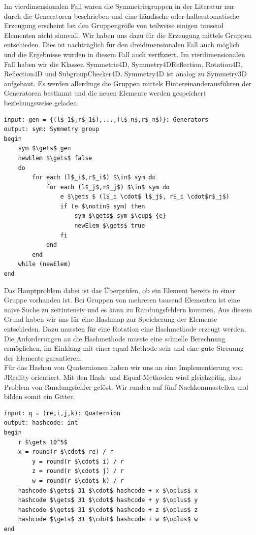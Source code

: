 Im vierdimensionalen Fall waren die Symmetriegruppen in der Literatur nur durch die Generatoren beschrieben und eine händische oder halbautomatische Erzeugung erscheint bei den Gruppengröße von teilweise einigen tausend Elementen nicht sinnvoll. Wir haben uns dazu für die Erzeugung mittels Gruppen entschieden. Dies ist nachträglich für den dreidimensionalen Fall auch möglich und die Ergebnisse wurden in diesem Fall auch verifiziert. Im vierdimensionalen Fall haben wir die Klassen Symmetrie4D, Symmetry4DReflection, Rotation4D, Reflection4D und SubgroupChecker4D.
Symmetry4D ist analog zu Symmetry3D aufgebaut. Es werden allerdings die Gruppen mittels Hintereinanderausführen der Generatoren bestimmt und die neuen Elemente werden gespeichert beziehungsweise geladen.
\begin{lstlisting}[mathescape, morekeywords={for, each, if, then, fi, do, begin,input, output, end, return}, caption={Peusdocode der Erzeugung einer Symmetriegruppe}, label=alg:fromgen]
input: gen = {(l$_1$,r$_1$),...,(l$_n$,r$_n$)}: Generators
output: sym: Symmetry group
begin	
	sym $\gets$ gen
	newElem $\gets$ false
	do
		for each (l$_i$,r$_i$) $\in$ sym do
			for each (l$_j$,r$_j$) $\in$ sym do
				e $\gets $ (l$_i \cdot$ l$_j$, r$_i \cdot$r$_j$)
				if (e $\notin$ sym) then
					sym $\gets$ sym $\cup$ {e}
					newElem $\gets$ true
				fi
			end
		end
	while (newElem)
end 

\end{lstlisting}
Das Hauptproblem dabei ist das Überprüfen, ob ein Element bereits in einer Gruppe vorhanden ist. Bei Gruppen von mehreren tausend Elementen ist eine naive Suche zu zeitintensiv und es kann zu Rundungsfehlern kommen. Aus diesem Grund haben wir uns für eine Hashmap zur Speicherung der Elemente entschieden. Dazu mussten für eine Rotation eine Hashmethode erzeugt werden. Die Anforderungen an die Hashmethode musste eine schnelle Berechnung ermöglichen, im Einklang mit einer equal-Methode sein und eine gute Streuung der Elemente garantieren.\\
Für das Hashen von Quaternionen haben wir uns an eine Implementierung von JReality orientiert. Mit den Hash- und Equal-Methoden wird gleichzeitig, dass Problem von Rundungsfehler gelöst. Wir runden auf fünf Nachkommastellen und bilden somit ein Gitter. 
\begin{lstlisting}[mathescape, morekeywords={for, each, if, then, fi, do, begin,input, output, end, return}, caption={Peusdocode der Erzeugung von Hashcode eines Quaternions}, label=alg:hash]
input: q = (re,i,j,k): Quaternion
output: hashcode: int
begin	
	r $\gets 10^5$
	x = round(r $\cdot$ re) / r
    	y = round(r $\cdot$ i) / r
    	z = round(r $\cdot$ j) / r
    	w = round(r $\cdot$ k) / r
	hashcode $\gets$ 31 $\cdot$ hashcode + x $\oplus$ x
	hashcode $\gets$ 31 $\cdot$ hashcode + y $\oplus$ y
	hashcode $\gets$ 31 $\cdot$ hashcode + z $\oplus$ z
	hashcode $\gets$ 31 $\cdot$ hashcode + w $\oplus$ w
end 
\end{lstlisting}
